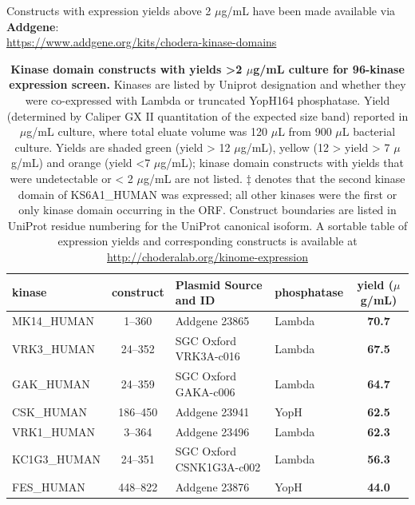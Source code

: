 \documentclass[9pt,lineno]{elife}
\begin{document}
Constructs with expression yields above 2 $\mu$g/mL have been made available via {\bf Addgene}:\\
\url{https://www.addgene.org/kits/chodera-kinase-domains}
\begin{table}[h!]
\centering
\caption{{\bf Kinase domain constructs with yields >2 $\mu$g/mL culture for 96-kinase expression screen.} 
Kinases are listed by Uniprot designation and whether they were co-expressed with Lambda or truncated YopH164 phosphatase.
Yield (determined by Caliper GX II quantitation of the expected size band) reported in $\mu$g/mL culture, where total eluate volume was 120 $\mu$L from 900 $\mu$L bacterial culture. 
Yields are shaded green (yield > 12 $\mu$g/mL), yellow (12 > yield > 7 $\mu$g/mL) and orange (yield <7 $\mu$g/mL); kinase domain constructs with yields that were undetectable or < 2 $\mu$g/mL are not listed.  
$\ddag$ denotes that the second kinase domain of KS6A1\_HUMAN was expressed; all other kinases were the first or only kinase domain occurring in the ORF.
Construct boundaries are listed in UniProt residue numbering for the UniProt canonical isoform.
A sortable table of expression yields and corresponding constructs is available at \url{http://choderalab.org/kinome-expression}
}
\label{expression_table}
\scriptsize
\begin{tabular}{p{3cm}cp{3.5cm}p{3cm}c}
\toprule
\bf{kinase} & \bf{construct} & \bf{Plasmid Source and ID}&\bf{phosphatase} & \bf{yield ($\mu$g/mL)} \\
\midrule
MK14\_HUMAN & 1--360& Addgene 23865&	Lambda                    & \cellcolor{forestgreen!55}\bf{70.7}                            \\
VRK3\_HUMAN & 24--352&SGC Oxford	VRK3A-c016 & Lambda                    & \cellcolor{forestgreen!55}\bf{67.5}                            \\
GAK\_HUMAN  & 24--359& SGC Oxford GAKA-c006 & Lambda                    & \cellcolor{forestgreen!55}\bf{64.7}                            \\
CSK\_HUMAN  & 186--450& Addgene	23941 & YopH         & \cellcolor{forestgreen!55}\bf{62.5}                            \\
VRK1\_HUMAN & 3--364& Addgene	23496 & Lambda                    & \cellcolor{forestgreen!55}\bf{62.3}                            \\
KC1G3\_HUMAN & 24--351 & SGC Oxford CSNK1G3A-c002 & Lambda                    & \cellcolor{forestgreen!55}\bf{56.3}                            \\
FES\_HUMAN  & 448--822 & Addgene 23876 & YopH         & \cellcolor{forestgreen!55}\bf{44.0}                            \\

\end{tabular}
\end{table}
\end{document}
